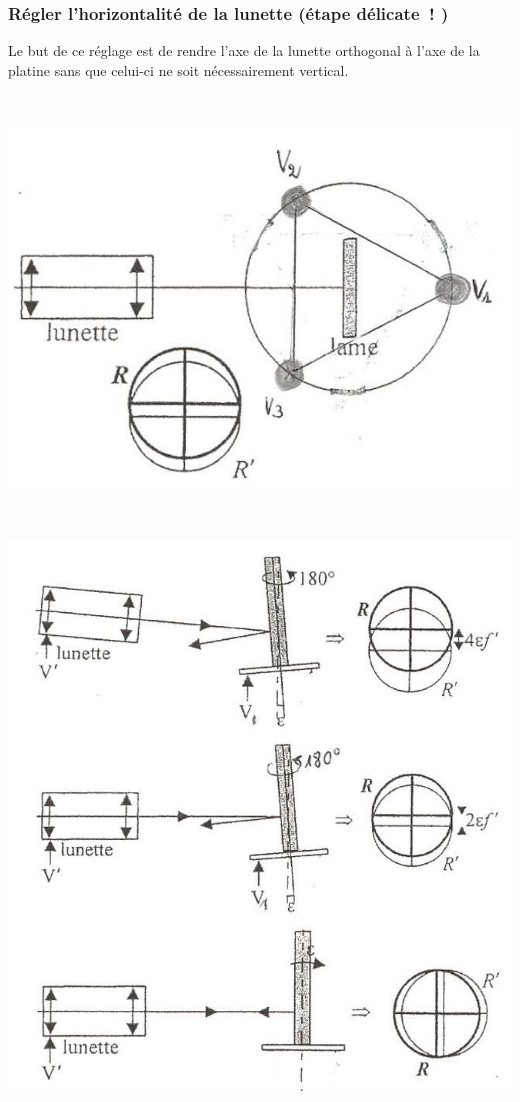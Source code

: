 \documentclass[../main/main.tex]{subfiles}
\begin{document}
{\subsubsection{Régler l'horizontalité de la lunette (étape délicate~! )}

Le but de ce réglage est de rendre l'axe de la lunette orthogonal à l'axe de la
platine sans que celui-ci ne soit nécessairement vertical.

\begin{minipage}[c]{.45\linewidth}
  ~
  \begin{center}
    \includegraphics[width=\linewidth]{reglage1}
  \end{center}
\end{minipage}
\hfill
\begin{minipage}[c]{.45\linewidth}
  ~
  \begin{center}
    \includegraphics[width=\linewidth]{reglage2}
  \end{center}
\end{minipage}

}
\end{document}
